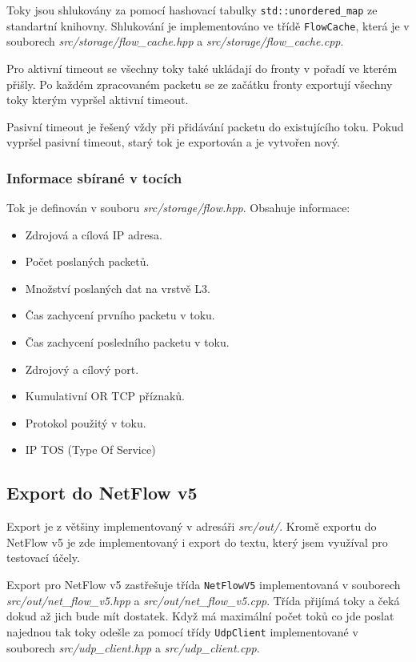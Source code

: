 \documentclass{article}
\begin{document}
Toky jsou shlukovány za pomocí hashovací tabulky \verb|std::unordered_map| ze
standartní knihovny. Shlukování je implementováno ve třídě \verb|FlowCache|,
která je v souborech \textit{src/storage/flow\_cache.hpp} a
\textit{src/storage/flow\_cache.cpp}.

Pro aktivní timeout se všechny toky také ukládají do fronty v pořadí ve kterém
přišly. Po každém zpracovaném packetu se ze začátku fronty exportují všechny
toky kterým vypršel aktivní timeout.

Pasivní timeout je řešený vždy při přidávání packetu do existujícího toku.
Pokud vypršel pasivní timeout, starý tok je exportován a je vytvořen nový.

\subsubsection{Informace sbírané v tocích}
Tok je definován v souboru \textit{src/storage/flow.hpp}. Obsahuje informace:
\begin{itemize}
    \item Zdrojová a cílová IP adresa.
    \item Počet poslaných packetů.
    \item Množství poslaných dat na vrstvě L3.
    \item Čas zachycení prvního packetu v toku.
    \item Čas zachycení posledního packetu v toku.
    \item Zdrojový a cílový port.
    \item Kumulativní OR TCP příznaků.
    \item Protokol použitý v toku.
    \item IP TOS (Type Of Service)
\end{itemize}

\subsection{Export do NetFlow v5}
Export je z většiny implementovaný v adresáři \textit{src/out/}. Kromě exportu
do NetFlow v5 je zde implementovaný i export do textu, který jsem využíval pro
testovací účely.

Export pro NetFlow v5 zastřešuje třída \verb|NetFlowV5| implementovaná v
souborech \textit{src/out/net\_flow\_v5.hpp} a
\textit{src/out/net\_flow\_v5.cpp}. Třída přijímá toky a čeká dokud až jich
bude mít dostatek. Když má maximální počet toků co jde poslat najednou tak toky
odešle za pomocí třídy \verb|UdpClient| implementované v souborech
\textit{src/udp\_client.hpp} a \textit{src/udp\_client.cpp}.
\end{document}
